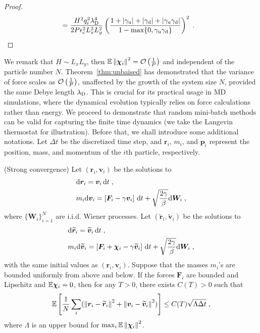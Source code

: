 \begin{proof}
\begin{align*}
    &= \frac{ H^2q_i^2\lambda_{\mathrm{D}}^4}{2P\epsilon_{\mathrm{c}}^2 L_x^2L_y^2}\left( \frac{1+\left\lvert\gamma_{\mathrm{u}}\right\rvert+\left\lvert\gamma_{\mathrm{d}}\right\rvert+\left\lvert\gamma_{\mathrm{u}}\gamma_{\mathrm{d}}\right\rvert}{1-\max\{0,\gamma_{\mathrm{u}}\gamma_{\mathrm{d}}\}}\right)^2\;.
\end{align*}
\end{proof}
We remark that $H\sim L_xL_y$, then $	\mathbb{E}\left\lVert\boldsymbol{\chi}_{i}\right\rVert^2=\mathcal{O}\left(\frac{1}{P}\right)$ and independent of the particle number $N$.
Theorem~\ref{thm:unbaised} has demonstrated that the variance of force scales as $\mathcal{O}\left(\frac{1}{P}\right)$, unaffected by the growth of the system size $N$, provided the same   Debye length $\lambda_{\mathrm{D}}$. 
This is crucial for its practical usage in MD simulations, where the dynamical evolution typically relies on force calculations rather than energy. 
We proceed to demonstrate  
that random mini-batch methods can be valid for capturing the finite time dynamics
(we take the Langevin thermostat for illustration). Before that, we shall introduce  some additional notations.
Let $\Delta t$ be the discretized time step, and $\bm{r}_i$, $m_i$, and $\bm{p}_i$ represent the position, mass, and momentum of the $i$th particle, respectively. 
\begin{thm}(Strong convergence)
Let $(\bm{r}_i, \bm{v}_i)$ be the solutions to
\[
\begin{split}
&\mathrm{d}\bm{r}_i=\bm{v}_i\,\mathrm{d} t\;,\\
&m_i \mathrm{d}\bm{v}_i=\left[\bm{F}_i-\gamma \bm{v}_i\right]\,\mathrm{d} t+\sqrt{\frac{2\gamma}{\beta}}\mathrm{d} \bm{W}_i\;,
\end{split}
\]
where $\{\bm{W}_i\}_{i=1}^N$ are i.i.d. Wiener processes. Let $(\widetilde{\bm{r}}_i, \widetilde{\bm{v}}_i)$ be the solutions to
\[
\begin{split}
&\mathrm{d} \widetilde{\bm{r}}_i=\widetilde{\bm{v}}_i\,\mathrm{d} t\;,\\
&m_i \mathrm{d}\widetilde{\bm{v}}_i=\left[\bm{F}_i +\bm{\chi}_i-\gamma \widetilde{\bm{v}}_i\right]\,\mathrm{d} t+\sqrt{\frac{2\gamma}{\beta}}\mathrm{d} \bm{W}_i\;,
\end{split}
\]
with the same initial values as $(\bm{r}_i, \bm{v}_i)$. Suppose that the masses $m_i$'s are bounded uniformly from above and below.
If the forces $\bm{F}_i$ are bounded and Lipschitz and $\mathbb{E} \bm{\chi}_i=0$, then for any $T>0$, there exists $C(T)>0$ such that
\[
\mathbb{E}\left[\frac{1}{N}\sum_i (\left\lVert\bm{r}_i-\widetilde{\bm{r}}_i\right\rVert^2
+\left\lVert\bm{v}_i-\widetilde{\bm{v}}_i\right\rVert^2) \right] \leq C(T)\sqrt{\Lambda \Delta t}\;,
\]
where $\Lambda$ is an upper bound for $\max_i  \mathbb{E}\left\lVert\bm{\chi}_i\right\rVert^2$.
\end{thm}
